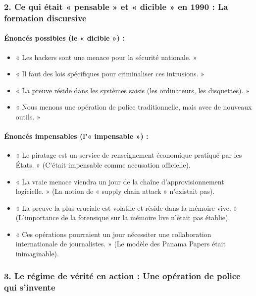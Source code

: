 \documentclass[12pt]{article}
\begin{document}
\subsubsection{2. Ce qui était « pensable » et « dicible » en 1990 : La formation discursive}

\paragraph{Énoncés possibles (le « dicible ») :}
\begin{itemize}
\item « Les hackers sont une menace pour la sécurité nationale. »
\item « Il faut des lois spécifiques pour criminaliser ces intrusions. »
\item « La preuve réside dans les systèmes saisis (les ordinateurs, les disquettes). »
\item « Nous menons une opération de police traditionnelle, mais avec de nouveaux outils. »
\end{itemize}

\paragraph{Énoncés impensables (l'« impensable ») :}
\begin{itemize}
\item « Le piratage est un service de renseignement économique pratiqué par les États. » (C'était impensable comme accusation officielle).
\item « La vraie menace viendra un jour de la chaîne d'approvisionnement logicielle. » (La notion de « supply chain attack » n'existait pas).
\item « La preuve la plus cruciale est volatile et réside dans la mémoire vive. » (L'importance de la forensique sur la mémoire live n'était pas établie).
\item « Ces opérations pourraient un jour nécessiter une collaboration internationale de journalistes. » (Le modèle des Panama Papers était inimaginable).
\end{itemize}

\subsubsection{3. Le régime de vérité en action : Une opération de police qui s'invente}
\end{document}
